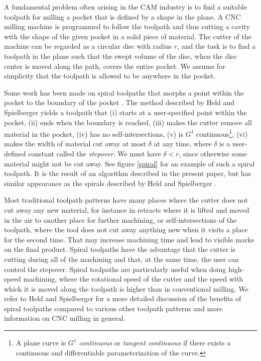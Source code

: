 \documentclass[3p]{elsarticle}
\newcommand{\comm}[1] {}
\newcommand{\stepover}{\delta}
\begin{document}
A fundamental problem often arising in the CAM\comm{\footnote{Computer-aided manufacturing.}} industry
is to find a suitable toolpath for milling a pocket that is defined by a shape in the plane.
A CNC\comm{\footnote{Computer numerical control.}} milling machine is programmed to follow
the toolpath and thus cutting a cavity with the shape of the given pocket in a solid piece of material.
The cutter of the machine can be regarded as a circular disc with radius $r$, and
the task is to find a toolpath in the plane
such that the swept volume of the disc, when the disc center is moved along the path,
covers the entire pocket. We assume for simplicity that the toolpath is allowed
to be anywhere in the pocket.

Some work has been made on spiral toolpaths that morphs a point
within the pocket to the boundary of the pocket \cite{bieterman2003, chuang2007, held2009, banerjee2012, held2014, huertas2014}.
The method described by Held and Spielberger
\cite{held2009} yields a toolpath that (i) starts at a user-specified
point within the pocket, (ii) ends when the boundary is reached, (iii) makes the cutter remove
all material in the pocket, (iv) has no self-intersections, (v)
is $G^1$ continuous\footnote{A plane curve
is \emph{$G^1$ continuous} or \emph{tangent continuous}
if there exists a continuous and differentiable parameterization of the curve.},
(vi) makes the width of material cut away at most $\stepover$ at any time, where
$\stepover$ is a user-defined constant called the \emph{stepover}.
We must have $\stepover<r$, since otherwise some material might not be cut away.
See figure \ref{spiral} for an example of such a spiral toolpath. It is the result of an algorithm
described in the present paper, but has similar appearance as the spirals described by Held and Spielberger
\cite{held2009}.

Most traditional toolpath patterns have many places where the cutter does not cut away any new
material, for instance in retracts where it is lifted and moved in the air to another place
for further machining, or self-intersections of the toolpath, where the tool
does not cut away anything new when it visits a place for the second time.
That may increase machining time and lead to visible marks on the
final product. Spiral toolpaths have the advantage that the cutter is
cutting during all of the machining and that, at the same time,
the user can control the stepover.
Spiral toolpaths are particularly useful when doing high-speed machining, where the
rotational speed of the cutter and the speed with which it is moved along the
toolpath is higher than in conventional milling.
We refer to Held and Spielberger \cite{held2009} for a more detailed discussion of
the benefits of spiral toolpaths compared to various other toolpath patterns
and more information on CNC milling in general.
\end{document}
